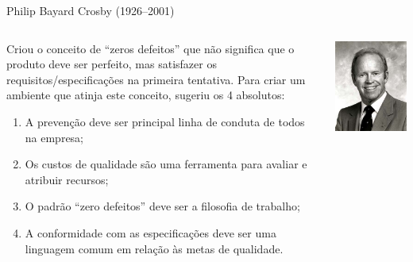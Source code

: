 \begin{frame}{Philip Bayard Crosby (1926--2001)}
  \begin{columns}\footnotesize
    \begin{column}{.65\textwidth}
      Criou o conceito de ``zeros defeitos'' que não significa que o
      produto deve ser perfeito, mas satisfazer os
      requisitos/especificações na primeira tentativa. Para criar um
      ambiente que atinja este conceito, sugeriu os 4 absolutos:
      \pause
      \begin{enumerate}[<+->]
      \item A prevenção deve ser principal linha de conduta de todos na empresa;
      \item Os custos de qualidade são uma ferramenta para avaliar e atribuir recursos;
      \item O padrão “zero defeitos” deve ser a filosofia de trabalho;
      \item A conformidade com as especificações deve ser uma linguagem comum em relação às metas de qualidade.
      \end{enumerate}
    \end{column}
    \begin{column}{.35\textwidth}
      \includegraphics[scale=.3]{img/crosby.png}
    \end{column}
  \end{columns}
\end{frame}


